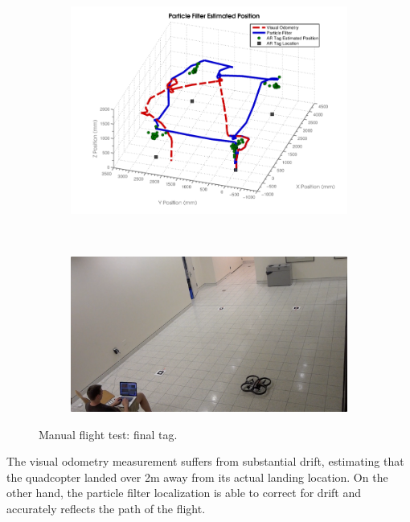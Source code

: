 	\begin{figure}[ht]
	        \centering
	        \begin{subfigure}[b]{0.75\textwidth}
	                \centering
	                \includegraphics[width=\textwidth]{../images/3dgraph_100.png}
	                \label{fig:tag5}
	        \end{subfigure}%
	        \\
	        \begin{subfigure}[b]{0.75\textwidth}
	                \centering
	                \includegraphics[width=\textwidth]{../images/frame5.png}
	                \label{fig:frame5}
	        \end{subfigure}
	        \caption{Manual flight test: final tag.}\label{fig:lasttag}
	\end{figure}

	The visual odometry measurement suffers from substantial drift, estimating that the quadcopter landed over 2m away from its actual landing location. On the other hand, the particle filter localization is able to correct for drift and accurately reflects the path of the flight.